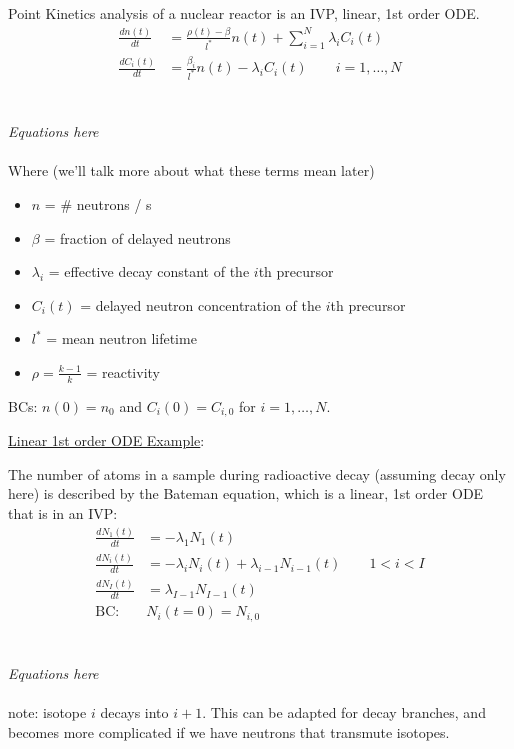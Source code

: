 \documentclass[12pt]{exam}
\begin{document}
Point Kinetics analysis of a nuclear reactor is an IVP, linear, 1st order ODE.
%
\ifprintanswers
\begin{align}
\frac{dn(t)}{dt} &= \frac{\rho(t) - \beta}{l^*}n(t) + \sum_{i=1}^{N} \lambda_i C_i(t) \nonumber \\
%
\frac{dC_i(t)}{dt} &= \frac{\beta_i}{l^*}n(t) - \lambda_i C_i(t) \qquad i=1,\dots,N \nonumber
\end{align}
\else
 \\ \\ 
 \hspace*{8em}\textit{Equations here}\\ \\
\fi
%
Where (we'll talk  more about what these terms mean later)
%
\begin{itemize}
\item $n$ = \# neutrons / s
\item $\beta$ = fraction of delayed neutrons
\item $\lambda_i$ = effective decay constant of the $i$th precursor
\item $C_i(t)$ = delayed neutron concentration of the $i$th precursor
\item $l^*$ = mean neutron lifetime
\item $\rho = \frac{k-1}{k}$ = reactivity
\end{itemize}
%
BCs: $n(0) = n_0$ and $C_i(0) = C_{i,0}$ for $i=1,\dots,N$.

\vspace*{1em}
\noindent \underline{Linear 1st order ODE Example}:

The number of atoms in a sample during radioactive decay (assuming decay only here) is described by the Bateman equation, which is a linear, 1st order ODE that is in an IVP:
%
\ifprintanswers
\begin{align}
\frac{dN_1(t)}{dt} &= -\lambda_1 N_1(t) \nonumber \\
\frac{dN_i(t)}{dt} &= -\lambda_i N_i(t) + \lambda_{i-1}N_{i-1}(t) \qquad 1 < i < I \nonumber\\
\frac{dN_I(t)}{dt} &= \lambda_{I-1} N_{I-1}(t) \nonumber \\
\text{BC: }& N_i(t=0) = N_{i,0}\nonumber
\end{align}
\else
 \\ \\ 
 \hspace*{8em}\textit{Equations here}\\ \\
\fi
%
note: isotope $i$ decays into $i+1$. This can be adapted for decay branches, and becomes more complicated if we have neutrons that transmute isotopes. 
\end{document}
